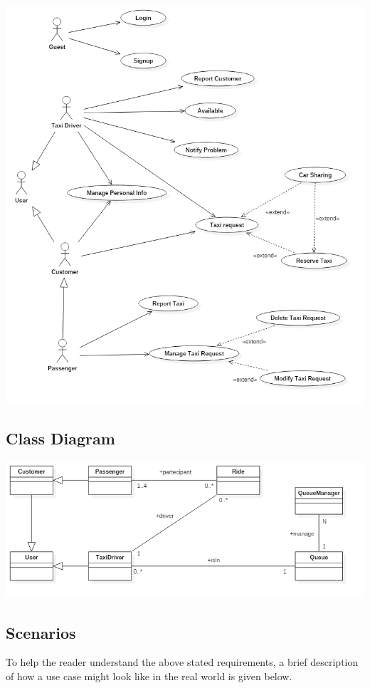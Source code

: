 \documentclass[english]{article}
\begin{document}
\includegraphics[width=\textwidth]{UseCase}

\subsection{Class Diagram}

\includegraphics[width=\textwidth]{ClassDiagram}

\subsection{Scenarios}

To help the reader understand the above stated requirements, a brief
description of how a use case might look like in the real world is
given below. 
\end{document}
